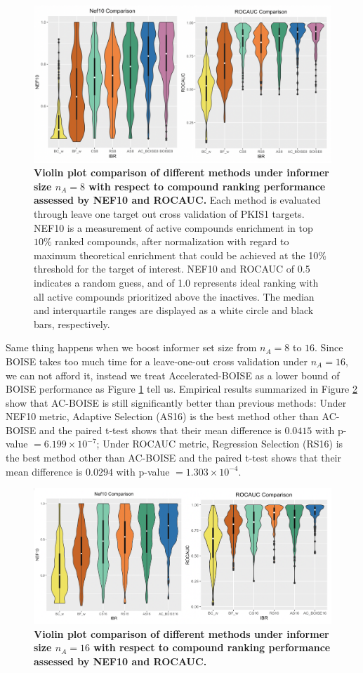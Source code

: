 \documentclass[12pt]{article}
\begin{document}
\begin{figure}[!ht]
\centering
\includegraphics[width=5.0in]{PKIS1_8_eval.png}
\caption{\label{fig:pkis8} 
{\bf Violin plot comparison of different methods under informer size $n_A =8$ with respect to compound ranking performance assessed by NEF10 and ROCAUC.} Each method is evaluated through leave one target out cross validation of PKIS1 targets. NEF10 is a measurement of active compounds enrichment in top $10\%$ ranked compounds, after normalization with regard to maximum theoretical enrichment that could be achieved at the 10\% threshold for the target of interest. NEF10 and ROCAUC of 0.5 indicates a random guess, and of 1.0 represents ideal ranking with all active compounds prioritized above the inactives. The median and interquartile ranges are displayed as a white circle and black bars, respectively.}
\end{figure}

Same thing happens when we boost informer set size from $n_A = 8$ to $16$. Since BOISE takes too much time for a leave-one-out cross validation under $n_A=16$, we can not afford it, instead we treat Accelerated-BOISE as a lower bound of BOISE performance as Figure \ref{fig:pkis8} tell us. Empirical results summarized in Figure \ref{fig:pkis16} show that AC-BOISE is still significantly better than previous methods: Under NEF10 metric, Adaptive Selection (AS16) is the best method other than AC-BOISE and the paired t-test shows that their mean difference is $0.0415$ with p-value $=6.199\times 10^{-7}$;  Under ROCAUC metric, Regression Selection (RS16) is the best method other than AC-BOISE and the paired t-test shows that their mean difference is $0.0294$ with p-value $=1.303\times 10^{-4}$. 
\begin{figure}[!ht]
\centering
\includegraphics[width=5.0in]{PKIS1_16_eval.png}
\caption{\label{fig:pkis16} 
{\bf Violin plot comparison of different methods under informer size $n_A =16$ with respect to compound ranking performance assessed by NEF10 and ROCAUC.}}
\end{figure}
\end{document}
